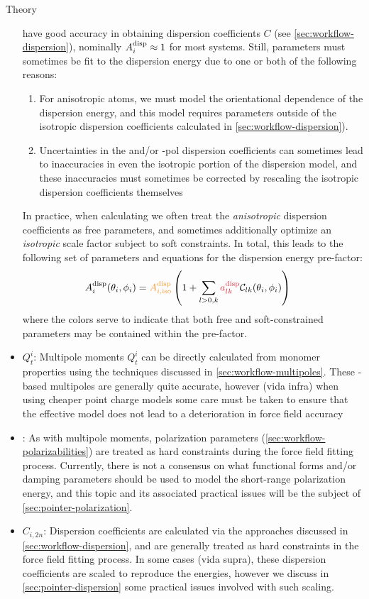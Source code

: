 \begin{subsection}{Theory}
\begin{itemize}
have good accuracy in obtaining dispersion coefficients $C$ (see
\cref{sec:workflow-dispersion}),
nominally $A^{\text{disp}}_{i} \approx 1$ for most systems. Still, parameters must
sometimes be fit to the dispersion energy due to one or both of the following reasons: 
    \begin{enumerate}
    \item For anisotropic atoms, we must model the orientational dependence of
    the dispersion energy, and this model requires parameters outside of 
    the isotropic dispersion coefficients calculated in
    \cref{sec:workflow-dispersion}).
    \item Uncertainties in the \idma and/or \isa-pol dispersion coefficients can
    sometimes lead to inaccuracies in even the isotropic portion of the
    dispersion model, and these inaccuracies must sometimes be corrected by rescaling
    the isotropic dispersion coefficients themselves
    \end{enumerate}
In practice, when calculating  we often treat the \emph{anisotropic}
dispersion coefficients \adisp as free parameters, and sometimes additionally
optimize an \emph{isotropic} scale factor subject to
soft constraints.\footnotemark{ }
In total, this leads to the following set of parameters and equations for the
dispersion energy pre-factor:
%
\begin{align}
\Adisp{i}(\theta_i,\phi_i) &=
\textcolor{cfit}{\Adisp{i,\text{iso}}}
\left(1 + 
\sum\limits_{l>0,k} \textcolor{fit}{\adisp}  \mathcal{C}_{lk}(\theta_i,\phi_i)
\right)
\end{align}
where the colors serve to indicate that both free and soft-constrained
parameters may be contained within the pre-factor.
%
\item \textcolor{mon}{$Q^i_t$}:
Multipole moments $Q^i_t$ can be directly calculated from monomer properties
using the techniques discussed in \cref{sec:workflow-multipoles}. These
\isa-based multipoles are generally quite accurate, however (vida infra) when
using cheaper point charge models some care must be taken to ensure that the
effective model does not lead to a deterioration in force field accuracy 
\item \textcolor{mon}{\vdrude}:
As with multipole moments, polarization parameters
(\cref{sec:workflow-polarizabilities}) are treated as hard
constraints during the force field fitting process. Currently, there is not a
consensus on what functional forms and/or damping parameters should be used to 
model the short-range polarization energy, and this topic and its associated
practical issues will be the subject of \cref{sec:pointer-polarization}.
\item \textcolor{mon}{$C_{i,2n}$}:
Dispersion coefficients are calculated via the approaches discussed in
\cref{sec:workflow-dispersion}, and are generally treated as hard constraints in the
force field fitting process. In some cases (vida supra), these dispersion
coefficients are scaled to reproduce the \sapt energies, however we discuss in
\cref{sec:pointer-dispersion} some practical issues involved with such
scaling.
\end{itemize}



\end{subsection}
